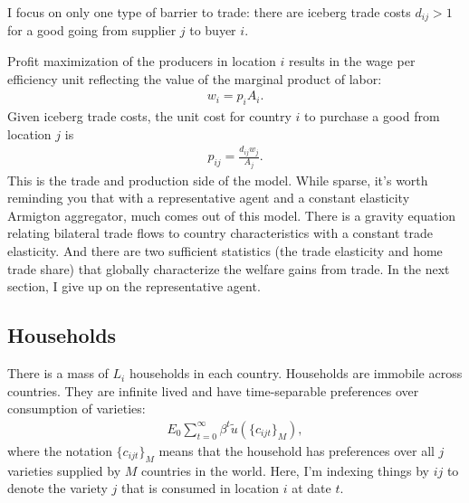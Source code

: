 \documentclass[12pt,pdftex]{article}
\begin{document}
\begin{onehalfspacing}
I focus on only one type of barrier to trade: there are iceberg trade costs $d_{ij} > 1$ for a good going from supplier $j$ to buyer $i$.

Profit maximization of the producers in location $i$ results in the wage per efficiency unit reflecting the value of the marginal product of labor:
\begin{align}
w_{i} = p_{i} A_{i}.
\label{eq:marginal-product}
\end{align}
Given iceberg trade costs, the unit cost for country $i$ to purchase a good from location $j$ is
\begin{align}
p_{ij} = \frac{d_{ij}w_{j}}{A_{j}}.
\label{eq:marginal-product-ship}
\end{align}
This is the trade and production side of the model. While sparse, it's worth reminding you that with a representative agent and a constant elasticity Armigton aggregator, much comes out of this model. There is a gravity equation relating bilateral trade flows to country characteristics with a constant trade elasticity. And there are two sufficient statistics (the trade elasticity and home trade share) that globally characterize the welfare gains from trade. In the next section, I give up on the representative agent.

\subsection{Households}

There is a mass of $L_i$ households in each country. Households are immobile across countries. They are infinite lived and have time-separable preferences over consumption of varieties:
\begin{align}
E_{0} \sum_{t = 0}^{\infty} \beta^{t} \tilde{u}( \{ c_{ijt} \}_{M}),
\end{align}
where the notation $\{ c_{ijt} \}_{M}$ means that the household has preferences over all $j$ varieties supplied by $M$ countries in the world. Here, I'm indexing things by $ij$ to denote the variety $j$ that is consumed in location $i$ at date $t$.


\end{onehalfspacing}
\end{document}
